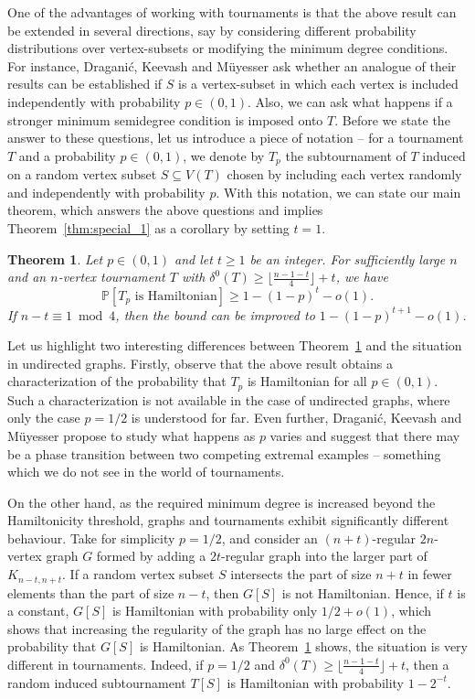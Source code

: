 \documentclass[a4paper,11pt]{article}
\newtheorem{theorem}{\bf Theorem}[section]
\theoremstyle{definition}
\def\Pb{\mathbb{P}}
\begin{document}
One of the advantages of working with tournaments is that the above result can be extended in several directions, say by considering different probability distributions over vertex-subsets or modifying the minimum degree conditions. For instance, Dragani\'c, Keevash and M\"uyesser ask whether an analogue of their results can be established if $S$ is a vertex-subset in which each vertex is included independently with probability $p\in (0, 1)$. Also, we can ask what happens if a stronger minimum semidegree condition is imposed onto $T$. Before we state the answer to these questions, let us introduce a piece of notation -- for a tournament $T$ and a probability $p\in (0, 1)$, we denote by $T_p$ the subtournament of $T$ induced on a random vertex subset $S\subseteq V(T)$ chosen by including each vertex randomly and independently with probability $p$. With this notation, we can state our main theorem, which answers the above questions and implies Theorem~\ref{thm:special_1} as a corollary by setting $t=1$. 

\begin{theorem}\label{thm:main}
Let $p\in (0, 1)$ and let $t\geq 1$ be an integer. For sufficiently large $n$ and an $n$-vertex tournament $T$ with $\delta^0(T)\geq \lfloor \frac{n-1-t}{4}\rfloor+t$, we have
\[\Pb[T_p\text{ is Hamiltonian}]\geq 1-(1-p)^{t}-o(1).\] 
If $n-t\equiv 1\bmod 4$, then the bound can be improved to $1-(1-p)^{t+1}-o(1)$.
\end{theorem}

Let us highlight two interesting differences between Theorem~\ref{thm:main} and the situation in undirected graphs. Firstly, observe that the above result obtains a characterization of the probability that $T_p$ is Hamiltonian for all $p\in (0, 1)$. Such a characterization is not available in the case of undirected graphs, where only the case $p=1/2$ is understood for far. Even further, Dragani\'c, Keevash and M\"uyesser propose to study what happens as $p$ varies and suggest that there may be a phase transition between two competing extremal examples -- something which we do not see in the world of tournaments.

On the other hand, as the required minimum degree is increased beyond the Hamiltonicity threshold, graphs and tournaments exhibit significantly different behaviour. Take for simplicity $p=1/2$, and consider an $(n+t)$-regular $2n$-vertex graph $G$ formed by adding a $2t$-regular graph into the larger part of $K_{n-t, n+t}$. If a random vertex subset $S$ intersects the part of size $n+t$ in fewer elements than the part of size $n-t$, then $G[S]$ is not Hamiltonian. Hence, if $t$ is a constant, $G[S]$ is Hamiltonian with probability only $1/2+o(1)$, which shows that increasing the regularity of the graph has no large effect on the probability that $G[S]$ is Hamiltonian. As Theorem~\ref{thm:main} shows, the situation is very different in tournaments. Indeed, if $p=1/2$ and $\delta^0(T)\geq \lfloor \frac{n-1-t}{4}\rfloor+t$, then a random induced subtournament $T[S]$ is Hamiltonian with probability $1-2^{-t}$.
\end{document}
